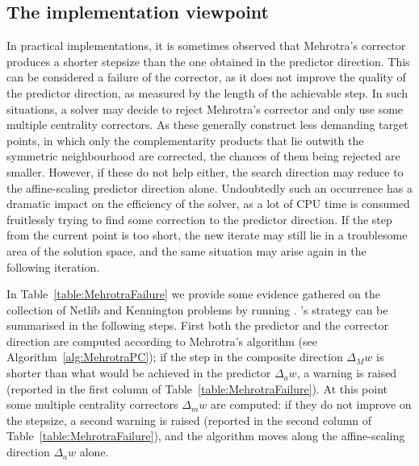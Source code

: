 
%
%
\subsection{The implementation viewpoint}

In practical implementations, it is sometimes observed
that Mehrotra's corrector produces a shorter stepsize 
than the one obtained in the predictor direction. 
This can be considered a failure of the corrector, as it
does not improve the quality of the predictor direction,
as measured by the length of the achievable step.
In such situations, a solver may decide to reject Mehrotra's corrector 
and only use some multiple centrality correctors. 
As these generally construct less demanding target points,
in which only the complementarity products that lie outwith
the symmetric neighbourhood are corrected,
the chances of them being rejected are smaller. 
However, if these do not help either, the search direction may reduce
to the affine-scaling predictor direction alone.
Undoubtedly such an occurrence has a dramatic impact on the 
efficiency of the solver, as a lot of CPU time is consumed
fruitlessly trying to find some correction to the predictor
direction.
If the step from the current point is too short, the new iterate may
still lie in a troublesome area of the solution space, and the
same situation may arise again in the following iteration.

In Table~\ref{table:MehrotraFailure} we provide some evidence
gathered on the collection of Netlib and Kennington problems
by running  \cite{HOPDM}.
\HOPDM's strategy can be summarised in the following steps.
First both the predictor and the corrector direction are
computed according to Mehrotra's algorithm 
(see Algorithm~\ref{alg:MehrotraPC}); if the step in the 
composite direction $\Delta_M w$ is shorter than what would be
achieved in the predictor $\Delta_a w$, a warning is raised
(reported in the first column of Table~\ref{table:MehrotraFailure}).
At this point some multiple centrality correctors $\Delta_m w$ are computed:
if they do not improve on the stepsize, a second warning is raised
(reported in the second column of Table~\ref{table:MehrotraFailure}),
and the algorithm moves along the affine-scaling direction $\Delta_a w$
alone.


